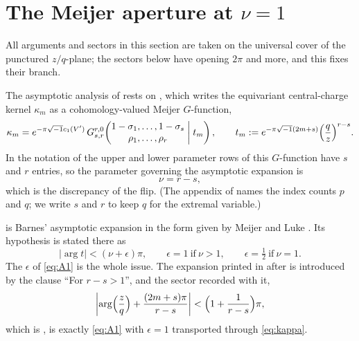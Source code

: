 \section{The Meijer aperture at \texorpdfstring{\(\nu=1\)}{nu = 1}}
\label{sec:aperture}

All arguments and sectors in this section are taken on the universal cover of
the punctured \(z/q\)-plane; the sectors below have opening \(2\pi\) and more,
and this fixes their branch.

The asymptotic analysis of \cite[Section~7]{SS} rests on
\cite[Lemma~7.4]{SS}, which writes the equivariant central-charge kernel
\(\kappa_{m}\) as a cohomology-valued Meijer \(G\)-function,
\begin{equation}
  \label{eq:kappa}
  \kappa_{m}
  =e^{-\pi\sqrt{-1}c_{1}(V')}\,
   G^{r,0}_{s,r}\!\left(
     \begin{matrix}1-\sigma_{1},\dots,1-\sigma_{s}\\ \rho_{1},\dots,\rho_{r}\end{matrix}
     \;\middle|\;t_{m}\right),
  \qquad
  t_{m}:=e^{-\pi\sqrt{-1}(2m+s)}\Bigl(\frac{q}{z}\Bigr)^{r-s}.
\end{equation}
In the notation of \cite[Appendix~A]{SS} the upper and lower parameter rows of
this \(G\)-function have \(s\) and \(r\) entries, so the parameter governing
the asymptotic expansion is
\begin{equation}
  \label{eq:nu}
  \nu=r-s,
\end{equation}
which is the discrepancy of the flip.  (The appendix of \cite{SS} names the
index counts \(p\) and \(q\); we write \(s\) and \(r\) to keep \(q\) for the
extremal variable.)

\cite[Theorem~A.1]{SS} is Barnes' asymptotic expansion \cite{Barnes} in the
form given by Meijer \cite{Meijer} and Luke \cite{Luke}.  Its hypothesis is
stated there as
\begin{equation}
  \label{eq:A1}
  |\arg t|<(\nu+\epsilon)\pi,
  \qquad
  \epsilon=1\ \text{if}\ \nu>1,
  \qquad
  \epsilon=\tfrac12\ \text{if}\ \nu=1 .
\end{equation}
The \(\epsilon\) of \eqref{eq:A1} is the whole issue.  The expansion printed
in \cite[Section~7]{SS} after \cite[Lemma~7.4]{SS} is introduced by the
clause ``For \(r-s>1\)'', and the sector recorded with it,
\begin{equation}
  \label{eq:ss64}
  \left|\arg\Bigl(\frac zq\Bigr)+\frac{(2m+s)\pi}{r-s}\right|
  <\Bigl(1+\frac1{r-s}\Bigr)\pi,
\end{equation}
which is \cite[(64)]{SS}, is exactly \eqref{eq:A1} with \(\epsilon=1\)
transported through \eqref{eq:kappa}.

